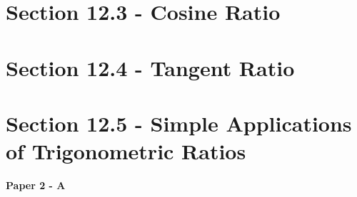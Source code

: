 \documentclass[12pt, a4paper]{article}
\begin{document}
\section*{Section 12.3 - Cosine Ratio}\label{section:2-12-3}





\section*{Section 12.4 - Tangent Ratio}\label{section:2-12-4}





\section*{Section 12.5 - Simple Applications of Trigonometric Ratios}\label{section:2-12-5}

\textbf{Paper 2 - A}
\begin{enumx}[label=\arabic*.,start=1]
\item {}\label{DSE2012-CoreP2-Q18} 
\item {}\label{DSE2014-CoreP2-Q18} 
\item {}\label{DSE2015-CoreP2-Q18} 
\item {}\label{DSE2016-CoreP2-Q21} 
\item {}\label{DSE2017-CoreP2-Q22} 
\item {}\label{DSE2018-CoreP2-Q21} 
\item {}\label{DSE2019-CoreP2-Q22} 
\item {}\label{DSE2021-CoreP2-Q24} 
\end{enumx}
\end{document}
